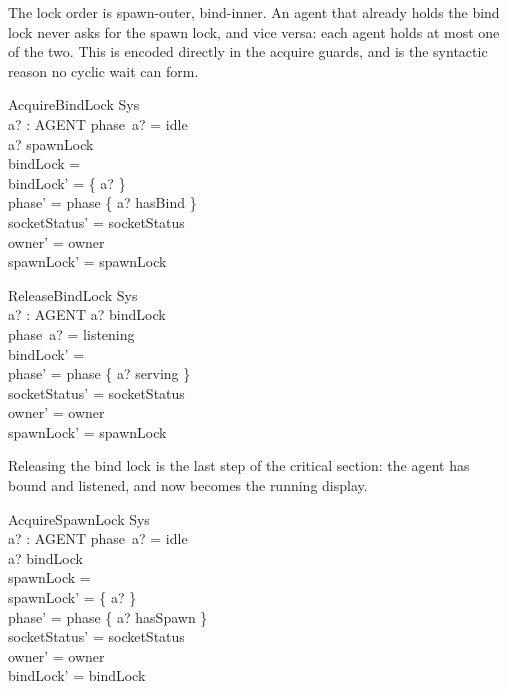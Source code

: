 \documentclass[a4paper,10pt,fleqn]{article}
\begin{document}
The lock order is spawn-outer, bind-inner.  An agent that already holds
the bind lock never asks for the spawn lock, and vice versa: each agent
holds at most one of the two.  This is encoded directly in the acquire
guards, and is the syntactic reason no cyclic wait can form.

\begin{schema}{AcquireBindLock}
  \Delta Sys \\
  a? : AGENT
\where
  phase~a? = idle \\
  a? \notin spawnLock \\
  bindLock = \emptyset \\
  bindLock' = \{ a? \} \\
  phase' = phase \oplus \{ a? \mapsto hasBind \} \\
  socketStatus' = socketStatus \\
  owner' = owner \\
  spawnLock' = spawnLock
\end{schema}

\begin{schema}{ReleaseBindLock}
  \Delta Sys \\
  a? : AGENT
\where
  a? \in bindLock \\
  phase~a? = listening \\
  bindLock' = \emptyset \\
  phase' = phase \oplus \{ a? \mapsto serving \} \\
  socketStatus' = socketStatus \\
  owner' = owner \\
  spawnLock' = spawnLock
\end{schema}

Releasing the bind lock is the last step of the critical section: the
agent has bound and listened, and now becomes the running display.

\begin{schema}{AcquireSpawnLock}
  \Delta Sys \\
  a? : AGENT
\where
  phase~a? = idle \\
  a? \notin bindLock \\
  spawnLock = \emptyset \\
  spawnLock' = \{ a? \} \\
  phase' = phase \oplus \{ a? \mapsto hasSpawn \} \\
  socketStatus' = socketStatus \\
  owner' = owner \\
  bindLock' = bindLock
\end{schema}
\end{document}
